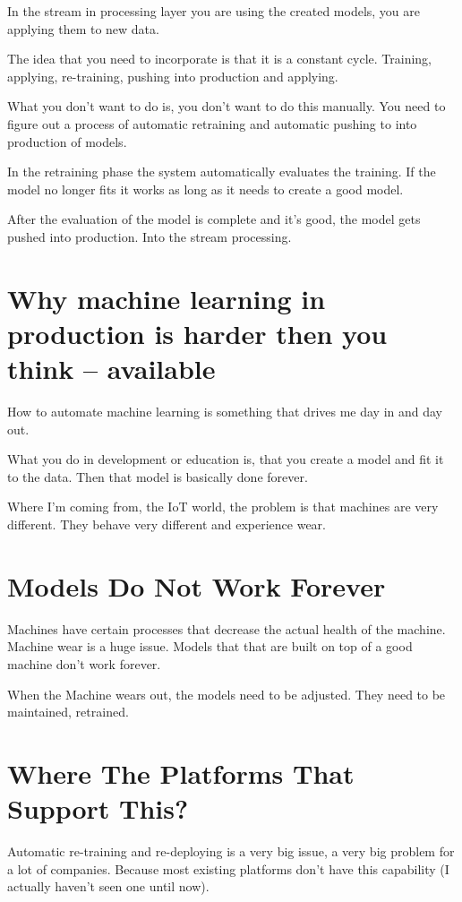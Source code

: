 \documentclass[12pt, numbers=noenddot]{scrreprt} %
\begin{document}
In the stream in processing layer you are using the created models, you are applying them to new data.

The idea that you need to incorporate is that it is a constant cycle. Training, applying, re-training, pushing into production and applying.

What you don’t want to do is, you don’t want to do this manually. You need to figure out a process of automatic retraining and automatic pushing to into production of models.

In the retraining phase the system automatically evaluates the training. If the model no longer fits it works as long as it needs to create a good model.

After the evaluation of the model is complete and it’s good, the model gets pushed into production. Into the stream processing.

\section{Why machine learning in production is harder then you think -- available}
How to automate machine learning is something that drives me day in and day out.

What you do in development or education is, that you create a model and fit it to the data. Then that model is basically done forever.

Where I’m coming from, the IoT world, the problem is that machines are very different. They behave very different and experience wear.

\section{Models Do Not Work Forever}

Machines have certain processes that decrease the actual health of the machine. Machine wear is a huge issue. Models that that are built on top of a good machine don’t work forever.

When the Machine wears out, the models need to be adjusted. They need to be maintained, retrained.


\section{Where The Platforms That Support This?}

Automatic re-training and re-deploying is a very big issue, a very big problem for a lot of companies. Because most existing platforms don’t have this capability (I actually haven't seen one until now).
\end{document}
